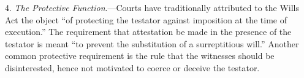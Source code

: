 

4. \textit{The Protective Function}.---Courts have traditionally attributed
to the Wills Act the object ``of protecting the testator against imposition at
the time of execution.'' The requirement that attestation be made in the
presence of the testator is meant ``to prevent the substitution of a
surreptitious will.'' Another common protective requirement is the rule that
the witnesses should be disinterested, hence not motivated to coerce or deceive
the testator.

